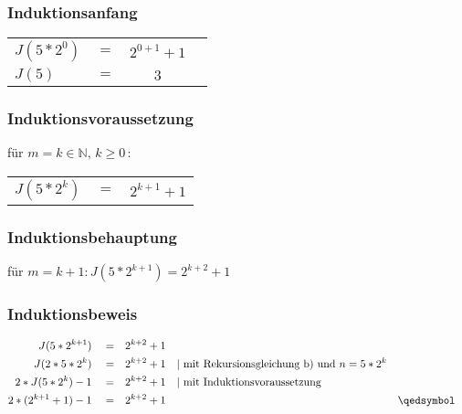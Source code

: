 \documentclass[titlepage]{article}
\begin{document}
			\subsubsection*{Induktionsanfang}
				
				\begin{tabular}{lccl}
					$J(5*2^0)$ & $=$ & $2^{0+1}+1$ & \\
					$J(5)$ & $=$ & $3$ & \\
				\end{tabular}
			
			\subsubsection*{Induktionsvoraussetzung}
				für $m=k \in \mathbb{N},\,k \ge 0 \, :$
				\begin{tabular}{lcc}
					$J(5*2^k)$ & $=$ & $2^{k+1}+1$ \\
				\end{tabular}
			\subsubsection*{Induktionsbehauptung}
				für $m=k+1 : J(5*2^{k+1})=2^{k+2}+1$
			\subsubsection*{Induktionsbeweis}
				\begin{align*}
					J(5*2^{k+1})&& &= &&2^{k+2}+1 \\
					J(2*5*2^k)&& &= &&2^{k+2}+1 &&\text{| mit Rekursionsgleichung b) und } n = 5*2^k\\
					2*J(5*2^k)-1&& &= &&2^{k+2}+1 &&\text{| mit Induktionsvoraussetzung }\\
					2*(2^{k+1}+1)-1&& &= &&2^{k+2}+1 && &&\qedsymbol
				\end{align*}
			\endgroup
			
\end{document}
